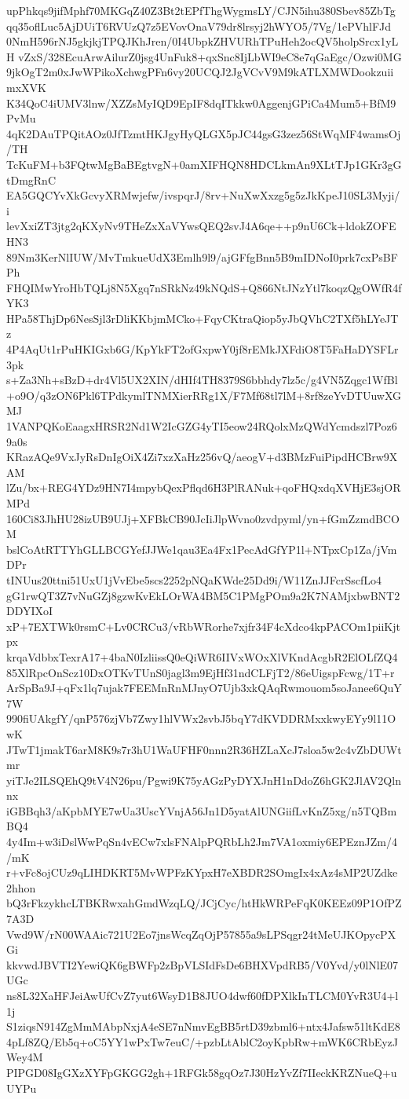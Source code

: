 upPhkqs9jifMphf70MKGqZ40Z3Bt2tEPfThgWygmsLY/CJN5ihu380Sbev85ZbTg
qq35oflLuc5AjDUiT6RVUzQ7z5EVovOnaV79dr8lrsyj2hWYO5/7Vg/1ePVhlFJd
0NmH596rNJ5gkjkjTPQJKhJren/0I4UbpkZHVURhTPuHeh2ocQV5holpSrcx1yLH
vZxS/328EcuArwAilurZ0jsg4UnFuk8+qxSnc8IjLbWI9eC8e7qGaEgc/Ozwi0MG
9jkOgT2m0xJwWPikoXchwgPFn6vy20UCQJ2JgVCvV9M9kATLXMWDookzuiimxXVK
K34QoC4iUMV3lnw/XZZsMyIQD9EpIF8dqITkkw0AggenjGPiCa4Mum5+BfM9PvMu
4qK2DAuTPQitAOz0JfTzmtHKJgyHyQLGX5pJC44gsG3zez56StWqMF4wamsOj/TH
TcKuFM+b3FQtwMgBaBEgtvgN+0amXIFHQN8HDCLkmAn9XLtTJp1GKr3gGtDmgRnC
EA5GQCYvXkGcvyXRMwjefw/ivspqrJ/8rv+NuXwXxzg5g5zJkKpeJ10SL3Myji/i
levXxiZT3jtg2qKXyNv9THeZxXaVYwsQEQ2svJ4A6qe++p9nU6Ck+ldokZOFEHN3
89Nm3KerNlIUW/MvTmkueUdX3Emlh9l9/ajGFfgBnn5B9mIDNoI0prk7cxPsBFPh
FHQIMwYroHbTQLj8N5Xgq7nSRkNz49kNQdS+Q866NtJNzYtl7koqzQgOWfR4fYK3
HPa58ThjDp6NesSjl3rDliKKbjmMCko+FqyCKtraQiop5yJbQVhC2TXf5hLYeJTz
4P4AqUt1rPuHKIGxb6G/KpYkFT2ofGxpwY0jf8rEMkJXFdiO8T5FaHaDYSFLr3pk
s+Za3Nh+sBzD+dr4Vl5UX2XIN/dHIf4TH8379S6bbhdy7lz5c/g4VN5Zqgc1WfBl
+o9O/q3zON6Pkl6TPdkymlTNMXierRRg1X/F7Mf68tl7lM+8rf8zeYvDTUuwXGMJ
1VANPQKoEaagxHRSR2Nd1W2IcGZG4yTI5eow24RQolxMzQWdYcmdszl7Poz69a0s
KRazAQe9VxJyRsDnIgOiX4Zi7xzXaHz256vQ/aeogV+d3BMzFuiPipdHCBrw9XAM
lZu/bx+REG4YDz9HN7I4mpybQexPflqd6H3PlRANuk+qoFHQxdqXVHjE3sjORMPd
160Ci83JhHU28izUB9UJj+XFBkCB90JcIiJlpWvno0zvdpyml/yn+fGmZzmdBCOM
bslCoAtRTTYhGLLBCGYefJJWe1qau3Ea4Fx1PecAdGfYP1l+NTpxCp1Za/jVmDPr
tINUus20ttni51UxU1jVvEbe5scs2252pNQaKWde25Dd9i/W11ZnJJFcrSscfLo4
gG1rwQT3Z7vNuGZj8gzwKvEkLOrWA4BM5C1PMgPOm9a2K7NAMjxbwBNT2DDYIXoI
xP+7EXTWk0rsmC+Lv0CRCu3/vRbWRorhe7xjfr34F4cXdco4kpPACOm1piiKjtpx
krqaVdbbxTexrA17+4baN0IzliissQ0eQiWR6IIVxWOxXlVKndAcgbR2ElOLfZQ4
85XlRpcOnScz10DxOTKvTUnS0jagl3m9EjHf31ndCLFjT2/86eUigspFcwg/1T+r
ArSpBa9J+qFx1lq7ujak7FEEMnRnMJnyO7Ujb3xkQAqRwmouom5soJanee6QuY7W
990fiUAkgfY/qnP576zjVb7Zwy1hlVWx2svbJ5bqY7dKVDDRMxxkwyEYy9l11OwK
JTwT1jmakT6arM8K9s7r3hU1WaUFHF0nnn2R36HZLaXcJ7sloa5w2c4vZbDUWtmr
yiTJe2ILSQEhQ9tV4N26pu/Pgwi9K75yAGzPyDYXJnH1nDdoZ6hGK2JlAV2Qlnnx
iGBBqh3/aKpbMYE7wUa3UscYVnjA56Jn1D5yatAlUNGiifLvKnZ5xg/n5TQBmBQ4
4y4Im+w3iDslWwPqSn4vECw7xlsFNAlpPQRbLh2Jm7VA1oxmiy6EPEznJZm/4/mK
r+vFc8ojCUz9qLIHDKRT5MvWPFzKYpxH7eXBDR2SOmgIx4xAz4sMP2UZdke2hhon
bQ3rFkzykhcLTBKRwxahGmdWzqLQ/JCjCyc/htHkWRPeFqK0KEEz09P1OfPZ7A3D
Vwd9W/rN00WAAic721U2Eo7jnsWcqZqOjP57855a9sLPSqgr24tMeUJKOpycPXGi
kkvwdJBVTI2YewiQK6gBWFp2zBpVLSIdFsDe6BHXVpdRB5/V0Yvd/y0lNlE07UGc
ns8L32XaHFJeiAwUfCvZ7yut6WsyD1B8JUO4dwf60fDPXlkInTLCM0YvR3U4+l1j
S1ziqsN914ZgMmMAbpNxjA4eSE7nNmvEgBB5rtD39zbml6+ntx4Jafsw51ltKdE8
4pLf8ZQ/Eb5q+oC5YY1wPxTw7euC/+pzbLtAblC2oyKpbRw+mWK6CRbEyzJWey4M
PIPGD08IgGXzXYFpGKGG2gh+1RFGk58gqOz7J30HzYvZf7IIeckKRZNueQ+uUYPu
